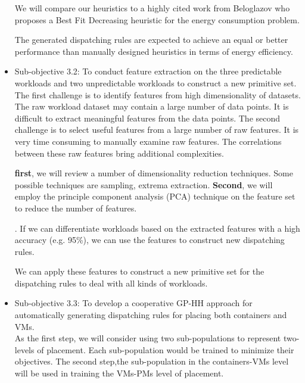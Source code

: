 \begin{itemize}
	 We will compare our heuristics to a highly cited work \cite{Beloglazov:2012ji} from Beloglazov who proposes a Best Fit Decreasing heuristic for the energy consumption problem.

	 The generated dispatching rules are expected to achieve an equal or better performance than manually designed heuristics in terms of energy efficiency. 

	\item Sub-objective 3.2: To conduct feature extraction on the three predictable workloads and two unpredictable workloads to construct a new primitive set. \\
	
	 The first challenge is to identify features from high dimensionality of datasets. The raw workload dataset may contain a large number of data points. It is difficult to extract meaningful features from the data points. The second challenge is to select useful features from a large number of raw features. It is very time consuming to manually examine raw features. The correlations between these raw features bring additional complexities.

	 \textbf{first}, we will review a number of dimensionality reduction techniques. Some possible techniques are sampling, extrema extraction. \textbf{Second}, we will employ the principle component analysis (PCA) technique on the feature set to reduce the number of features. 

	. If we can differentiate workloads based on the extracted features with a high accuracy (e.g. 95\%), we can use the features to construct new dispatching rules. 

	 We can apply these features to construct a new primitive set for the dispatching rules to deal with all kinds of workloads.



	\item Sub-objective 3.3: To develop a cooperative GP-HH approach for automatically generating dispatching rules for placing both containers and VMs. \\
	As the first step, we will consider using two sub-populations to represent two-levels of placement. Each sub-population would be trained to minimize their objectives. The second step,the sub-population in the containers-VMs level will be used in training the VMs-PMs level of placement. 


	\end{itemize}
